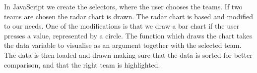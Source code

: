 \documentclass[Report.tex]{subfiles}
\begin{document}
In JavaScript we create the selectors, where the user chooses the teams. If two teams are chosen the radar chart is drawn. The radar chart is based \cite{Radar} and modified to our needs. One of the modifications is that we draw a bar chart if the user presses a value, represented by a circle. The function which draws the chart takes the data variable to visualise as an argument together with the selected team. The data is then loaded and drawn making sure that the data is sorted for better comparison, and that the right team is highlighted.
\end{document}
